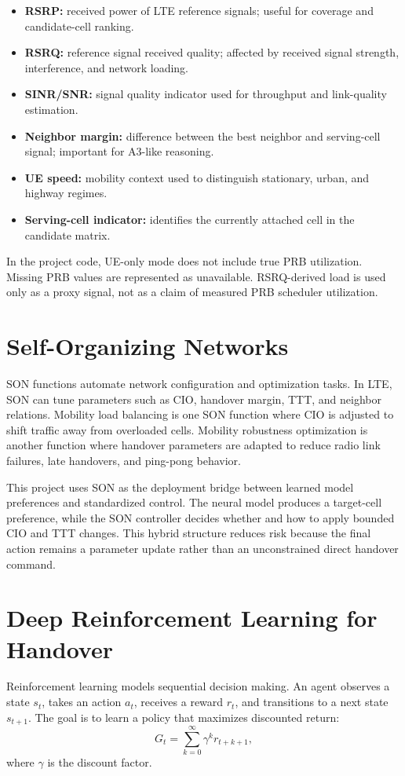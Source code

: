 \documentclass[12pt,a4paper]{report}
\begin{document}
\begin{itemize}
    \item \textbf{RSRP:} received power of LTE reference signals; useful for coverage and candidate-cell ranking.
    \item \textbf{RSRQ:} reference signal received quality; affected by received signal strength, interference, and network loading.
    \item \textbf{SINR/SNR:} signal quality indicator used for throughput and link-quality estimation.
    \item \textbf{Neighbor margin:} difference between the best neighbor and serving-cell signal; important for A3-like reasoning.
    \item \textbf{UE speed:} mobility context used to distinguish stationary, urban, and highway regimes.
    \item \textbf{Serving-cell indicator:} identifies the currently attached cell in the candidate matrix.
\end{itemize}

In the project code, UE-only mode does not include true PRB utilization. Missing PRB values are represented as unavailable. RSRQ-derived load is used only as a proxy signal, not as a claim of measured PRB scheduler utilization.

\section{Self-Organizing Networks}
SON functions automate network configuration and optimization tasks. In LTE, SON can tune parameters such as CIO, handover margin, TTT, and neighbor relations. Mobility load balancing is one SON function where CIO is adjusted to shift traffic away from overloaded cells. Mobility robustness optimization is another function where handover parameters are adapted to reduce radio link failures, late handovers, and ping-pong behavior.

This project uses SON as the deployment bridge between learned model preferences and standardized control. The neural model produces a target-cell preference, while the SON controller decides whether and how to apply bounded CIO and TTT changes. This hybrid structure reduces risk because the final action remains a parameter update rather than an unconstrained direct handover command.

\section{Deep Reinforcement Learning for Handover}
Reinforcement learning models sequential decision making. An agent observes a state $s_t$, takes an action $a_t$, receives a reward $r_t$, and transitions to a next state $s_{t+1}$. The goal is to learn a policy that maximizes discounted return:
\begin{equation}
    G_t = \sum_{k=0}^{\infty} \gamma^k r_{t+k+1},
\end{equation}
where $\gamma$ is the discount factor.
\end{document}

